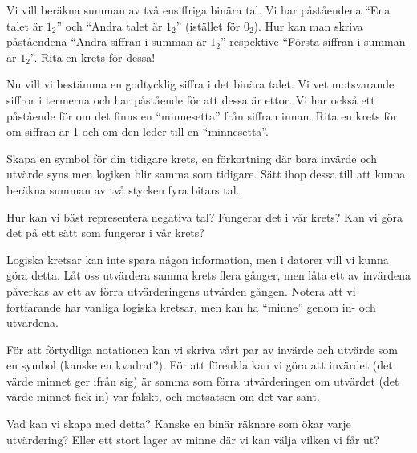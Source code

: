 \begin{problem}
	Vi vill beräkna summan av två ensiffriga binära tal. Vi har påståendena ``Ena talet är \(1_2\)'' och ``Andra talet är \(1_2\)'' (istället för \(0_2\)). Hur kan man skriva påståendena ``Andra siffran i summan är \(1_2\)'' respektive ``Första siffran i summan är \(1_2\)''. Rita en krets för dessa!
\end{problem}

\begin{problem}
	Nu vill vi bestämma en godtycklig siffra i det binära talet. Vi vet motsvarande siffror i termerna och har påstående för att dessa är ettor. Vi har också ett påstående för om det finns en ``minnesetta'' från siffran innan. Rita en krets för om siffran är 1 och om den leder till en ``minnesetta''.
\end{problem}

\begin{problem}
	Skapa en symbol för din tidigare krets, en förkortning där bara invärde och utvärde syns men logiken blir samma som tidigare. Sätt ihop dessa till att kunna beräkna summan av två stycken fyra bitars tal.
\end{problem}

\begin{problem}[Extra]
	Hur kan vi bäst representera negativa tal? Fungerar det i vår krets? Kan vi göra det på ett sätt som fungerar i vår krets?
\end{problem}

\begin{problem}[Extra]
	Logiska kretsar kan inte spara någon information, men i datorer vill vi kunna göra detta. Låt oss utvärdera samma krets flera gånger, men låta ett av invärdena påverkas av ett av förra utvärderingens utvärden gången. Notera att vi fortfarande har vanliga logiska kretsar, men kan ha ``minne'' genom in- och utvärdena. 

	För att förtydliga notationen kan vi skriva vårt par av invärde och utvärde som en symbol (kanske en kvadrat?). För att förenkla kan vi göra att invärdet (det värde minnet ger ifrån sig) är samma som förra utvärderingen om utvärdet (det värde minnet fick in) var falskt, och motsatsen om det var sant.

	Vad kan vi skapa med detta? Kanske en binär räknare som ökar varje utvärdering? Eller ett stort lager av minne där vi kan välja vilken vi får ut?
\end{problem}


% 
